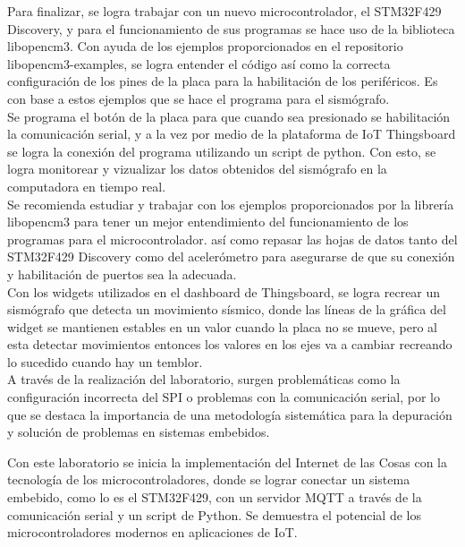 

Para finalizar, se logra trabajar con un nuevo microcontrolador, el STM32F429 Discovery, y para el funcionamiento de sus programas se hace uso de la biblioteca libopencm3. Con ayuda de los ejemplos proporcionados en el repositorio libopencm3-examples, se logra entender el código así como la correcta configuración de los pines de la placa para la habilitación de los periféricos. Es con base a estos ejemplos que se hace el programa para el sismógrafo. \\

Se programa el botón de la placa para que cuando sea presionado se habilitación la comunicación serial, y a la vez por medio de la plataforma de IoT Thingsboard se logra la conexión del programa utilizando un script de python. Con esto, se logra monitorear y vizualizar los datos obtenidos del sismógrafo en la computadora en tiempo real. \\


Se recomienda estudiar y trabajar con los ejemplos proporcionados por la librería libopencm3 para tener un mejor entendimiento del funcionamiento de los programas para el microcontrolador. así como repasar las hojas de datos tanto del STM32F429 Discovery como del acelerómetro para asegurarse de que su conexión y habilitación de puertos sea la adecuada. \\

Con los widgets utilizados en el dashboard de Thingsboard, se logra recrear un sismógrafo que detecta un movimiento sísmico, donde las líneas de la gráfica del widget se mantienen estables en un valor cuando la placa no se mueve, pero al esta detectar movimientos entonces los valores en los ejes va a cambiar recreando lo sucedido cuando hay un temblor. \\

A través de la realización del laboratorio, surgen problemáticas como la configuración incorrecta del SPI o problemas con la comunicación serial, por lo que se destaca la importancia de una metodología sistemática para la depuración y solución de problemas en sistemas embebidos. 

Con este laboratorio se inicia la implementación del Internet de las Cosas con la tecnología de los microcontroladores, donde se lograr conectar un sistema embebido, como lo es el STM32F429, con un servidor MQTT a través de la comunicación serial y un script de Python. Se demuestra el potencial de los microcontroladores modernos en aplicaciones de IoT. 
